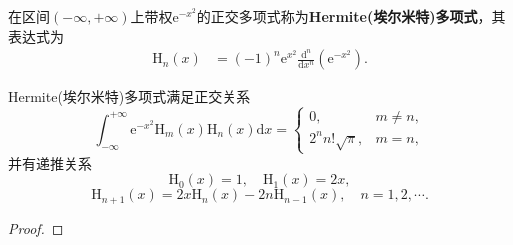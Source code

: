 \documentclass[../../main.tex]{subfiles}
\begin{document}
\begin{definition}
在区间$(-\infty,+\infty)$上带权$\mathrm{e}^{-x^2}$的正交多项式称为\textbf{Hermite(埃尔米特)多项式}，其表达式为
\begin{align}\label{eq:数值分析-3-2.18}
\mathrm{H}_n(x) &= (-1)^n \mathrm{e}^{x^2} \frac{\mathrm{d}^n}{\mathrm{d}x^n}(\mathrm{e}^{-x^2}).
\end{align}
\end{definition}

\begin{theorem}
Hermite(埃尔米特)多项式满足正交关系
$$\int_{-\infty}^{+\infty} \mathrm{e}^{-x^2}\mathrm{H}_m(x)\mathrm{H}_n(x)\mathrm{d}x =
\begin{cases}
0, & m \neq n, \\
2^n n! \sqrt{\pi}, & m = n,
\end{cases}$$
并有递推关系
$$\mathrm{H}_0(x) = 1,\quad \mathrm{H}_1(x) = 2x,$$
$$\mathrm{H}_{n+1}(x) = 2x\mathrm{H}_n(x) - 2n\mathrm{H}_{n-1}(x),\quad n = 1,2,\cdots.$$
\end{theorem}
\begin{proof}


\end{proof}
\end{document}
